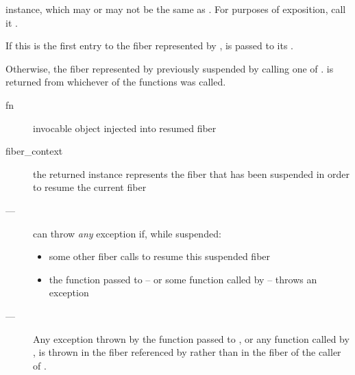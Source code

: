 \begin{description}
\begin{description}
                       instance, which may or may not be the same
                       as . For purposes of exposition, call
                       it .
            \item[---] If this is the first entry to the fiber represented
                       by ,  is passed to its \entryfn.
            \item[---] Otherwise, the fiber represented by 
                       previously suspended by calling one
                       of \allresume.  is returned from whichever
                       of the  functions was called.
        \end{description}
\end{description}

\params
\begin{description}
    \item[fn] invocable object injected into resumed fiber
\end{description}

\returns
\begin{description}
    \item[fiber\_context] the returned instance represents the fiber that has been
                 suspended in order to resume the current fiber
\end{description}

\except
\begin{description}
    \item[---] \allresume can
              throw \emph{any} exception if, while suspended:
              \begin{itemize}
                  \item some other fiber calls \someresumewith to
                        resume this suspended fiber
                  \item the function  passed to \someresumewith
                        -- or some function called
                        by  -- throws an exception
              \end{itemize}
    \item[---] Any exception thrown by the function  passed
              to \someresumewith, or any function called
              by , is thrown in the fiber referenced by 
              rather than in the fiber of the caller of \someresumewith.
\end{description}

